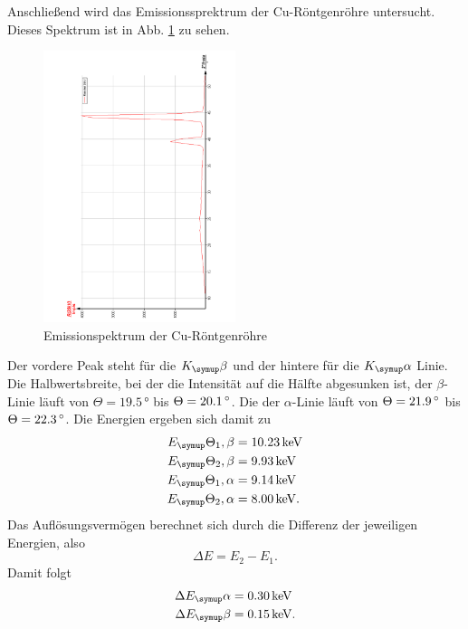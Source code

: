Anschließend wird das Emissionssprektrum der Cu-Röntgenröhre untersucht.
Dieses Spektrum ist in Abb. \ref{fig:EmissionCu} zu sehen.
\begin{figure}[h]
  \centering
  \includegraphics[width=0.5\textwidth, angle=270]{bilder/EmissionCu.pdf}
  \caption{Emissionspektrum der Cu-Röntgenröhre}
  \label{fig:EmissionCu}
\end{figure}
Der vordere Peak steht für die $K_\su{\beta}$ und der hintere für die $K_\su{\alpha}$
Linie. Die Halbwertsbreite, bei der die Intensität auf die Hälfte abgesunken ist,
der $\beta$-Linie läuft von $\Theta = 19.5\,\si{\degree}$ bis $\Theta = 20.1\,\si{\degree}$.
Die der $\alpha$-Linie läuft von $\Theta = 21.9\,\si{\degree}$ bis $\Theta = 22.3\,\si{\degree}$.
Die Energien ergeben sich damit zu
\begin{align}
  E_\su{\Theta_1, \beta} &= 10.23 \keV \\
  E_\su{\Theta_2, \beta} &= 9.93 \keV \\
  E_\su{\Theta_1, \alpha} &= 9.14 \keV \\
  E_\su{\Theta_2, \alpha} &= 8.00 \keV. \\
\end{align}
Das Auflösungsvermögen berechnet sich durch die Differenz der jeweiligen Energien,
also
\begin{equation}
  \Delta E = E_2 - E_1.
\end{equation}
Damit folgt
\begin{align}
  \Delta E_\su{\alpha} &= 0.30 \keV  \\
  \Delta E_\su{\beta} &= 0.15 \keV. \\
\end{align}


